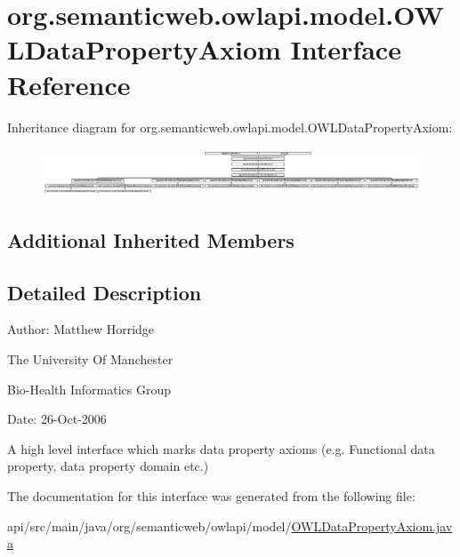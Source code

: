 \hypertarget{interfaceorg_1_1semanticweb_1_1owlapi_1_1model_1_1_o_w_l_data_property_axiom}{\section{org.\-semanticweb.\-owlapi.\-model.\-O\-W\-L\-Data\-Property\-Axiom Interface Reference}
\label{interfaceorg_1_1semanticweb_1_1owlapi_1_1model_1_1_o_w_l_data_property_axiom}
}
Inheritance diagram for org.\-semanticweb.\-owlapi.\-model.\-O\-W\-L\-Data\-Property\-Axiom\-:\begin{figure}[H]
\begin{center}
\leavevmode
\includegraphics[height=1.447964cm]{interfaceorg_1_1semanticweb_1_1owlapi_1_1model_1_1_o_w_l_data_property_axiom}
\end{center}
\end{figure}
\subsection*{Additional Inherited Members}


\subsection{Detailed Description}
Author\-: Matthew Horridge\par
 The University Of Manchester\par
 Bio-\/\-Health Informatics Group\par
 Date\-: 26-\/\-Oct-\/2006\par
\par


A high level interface which marks data property axioms (e.\-g. Functional data property, data property domain etc.) 

The documentation for this interface was generated from the following file\-:\begin{DoxyCompactItemize}
\item 
api/src/main/java/org/semanticweb/owlapi/model/\hyperlink{_o_w_l_data_property_axiom_8java}{O\-W\-L\-Data\-Property\-Axiom.\-java}\end{DoxyCompactItemize}

